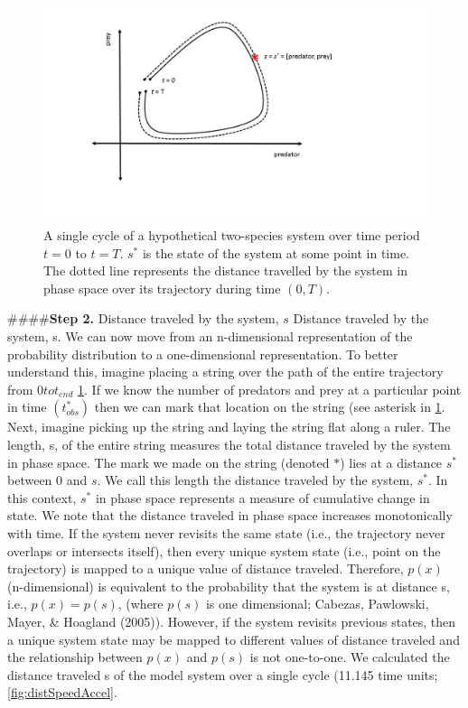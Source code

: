 \documentclass[12pt,twoside]{reedthesis}
\begin{document}
\begin{figure}
\includegraphics[width=1\linewidth]{./chapterFiles/fiGuide/figures/stringFig} \caption{A single cycle of a hypothetical two-species system over time period $t = 0$ to $t = T$. $s^*$ is the state of the system at some point in time. The dotted line represents the distance travelled by the system in phase space over its trajectory during time $(0, T)$.}\label{fig:stringFig}
\end{figure}
\#\#\#\#\textbf{Step 2.} Distance traveled by the system, \(s\)
Distance traveled by the system, s. We can now move from an n-dimensional representation of the probability distribution to a one-dimensional representation. To better understand this, imagine placing a string over the path of the entire trajectory from \(0 to t_{end}\) \ref{fig:stringFig}. If we know the number of predators and prey at a particular point in time \((t_{obs}^*)\) then we can mark that location on the string (see asterisk in \ref{fig:stringFig}. Next, imagine picking up the string and laying the string flat along a ruler. The length, s, of the entire string measures the total distance traveled by the system in phase space. The mark we made on the string (denoted \(*\)) lies at a distance \(s^*\) between 0 and \(s\). We call this length the distance traveled by the system, \(s^*\). In this context, \(s^*\) in phase space represents a measure of cumulative change in state. We note that the distance traveled in phase space increases monotonically with time. If the system never revisits the same state (i.e., the trajectory never overlaps or intersects itself), then every unique system state (i.e., point on the trajectory) is mapped to a unique value of distance traveled. Therefore, \(p(x)\) (n-dimensional) is equivalent to the probability that the system is at distance s, i.e., \(p(x)=p(s)\), (where \(p(s)\) is one dimensional; Cabezas, Pawlowski, Mayer, \& Hoagland (2005)). However, if the system revisits previous states, then a unique system state may be mapped to different values of distance traveled and the relationship between \(p(x)\) and \(p(s)\) is not one-to-one. We calculated the distance traveled s of the model system over a single cycle (11.145 time units; \ref{fig:distSpeedAccel}.
\end{document}
